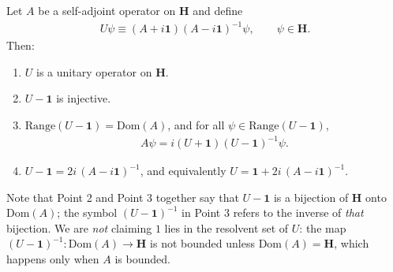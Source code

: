 \begin{theorem}
    \label{thrm:hall-10.28}
    \leanok
    Let $A$ be a self-adjoint operator on $\mathbf{H}$ and define
    \begin{align}
        U\psi \equiv (A + i\mathbf{1})(A - i\mathbf{1})^{-1}\psi, \qquad \psi \in \mathbf{H}.
    \end{align}
    Then:
    \begin{enumerate}
        \item $U$ is a unitary operator on $\mathbf{H}$.
        \item $U - \mathbf{1}$ is injective.
        \item $\text{Range}(U - \mathbf{1}) = \text{Dom}(A)$, and for all $\psi \in \text{Range}(U-\mathbf{1})$,
        \begin{align}
            A\psi = i(U + \mathbf{1})(U - \mathbf{1})^{-1}\psi.
        \end{align}
        \item $U - \mathbf{1} = 2i\,(A - i\mathbf{1})^{-1}$, and equivalently $U = \mathbf{1} + 2i\,(A-i\mathbf{1})^{-1}$.
    \end{enumerate}
    Note that Point 2 and Point 3 together say that $U - \mathbf{1}$ is a bijection of $\mathbf{H}$ onto $\text{Dom}(A)$; the symbol $(U-\mathbf{1})^{-1}$ in Point 3 refers to the inverse of \textit{that} bijection. We are \textit{not} claiming $1$ lies in the resolvent set of $U$: the map $(U-\mathbf{1})^{-1} : \text{Dom}(A) \to \mathbf{H}$ is not bounded unless $\text{Dom}(A) = \mathbf{H}$, which happens only when $A$ is bounded.
\end{theorem}
